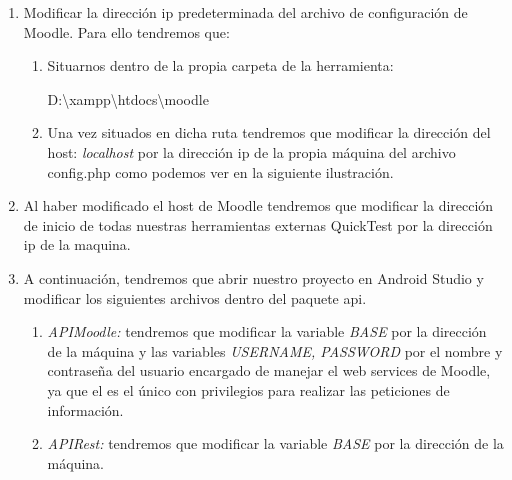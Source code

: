 \begin{enumerate}
	
	\item Modificar la dirección ip predeterminada del archivo de configuración de Moodle. Para ello tendremos que:
	\begin{enumerate}
		\item Situarnos dentro de la propia carpeta de la herramienta: 

D:\textbackslash{}xampp\textbackslash{}htdocs\textbackslash{}moodle
		\item Una vez situados en dicha ruta tendremos que modificar la dirección del host: \emph{localhost} por la dirección ip de la propia máquina del archivo config.php como podemos ver en la siguiente ilustración.
	\end{enumerate}		
	
	\item Al haber modificado el host de Moodle tendremos que modificar la dirección de inicio de todas nuestras herramientas externas QuickTest por la dirección ip de la maquina. 
	
	\item A continuación, tendremos que abrir nuestro proyecto en Android Studio y modificar los siguientes archivos dentro del paquete api. 
	
	\begin{enumerate}
		
		\item \emph{APIMoodle:} tendremos que modificar la variable \emph{BASE} por la dirección de la máquina y las variables \emph{USERNAME, PASSWORD} por el nombre y contraseña del usuario encargado de manejar el web services de Moodle, ya que el es el único con privilegios para realizar las peticiones de información. 
		
		\item \emph{APIRest:} tendremos que modificar la variable \emph{BASE} por la dirección de la máquina. 
		
	\end{enumerate}
	 
\end{enumerate}

